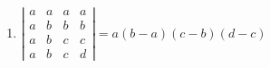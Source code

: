 \begin{enumerate}
\begin{enumerate}
 \item $\left|\begin{array}{cccc}
 a      &a      &a      &a \\
 a      &b      &b      &b \\
 a      &b      &c      &c \\
 a      &b      &c      &d
 \end{array}\right|=a(b-a)(c-b)(d-c)$
 \end{enumerate}

\end{enumerate}
